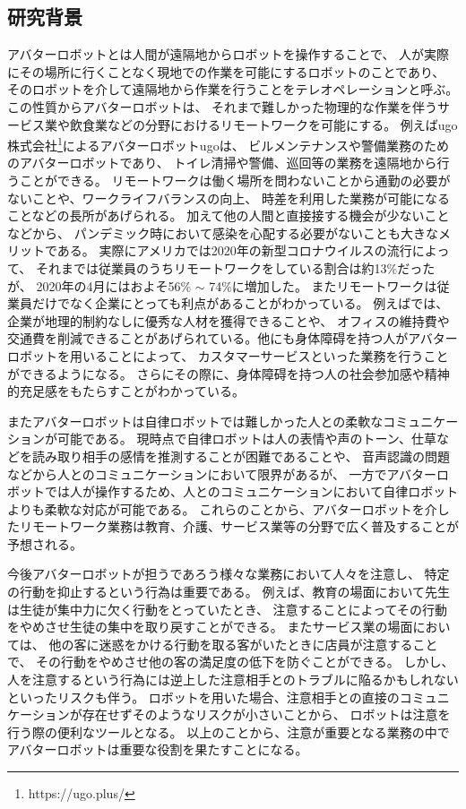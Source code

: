 \documentclass{kuisthesis}
\begin{document}
\subsection{研究背景} %
アバターロボットとは人間が遠隔地からロボットを操作することで、
人が実際にその場所に行くことなく現地での作業を可能にするロボットのことであり、
そのロボットを介して遠隔地から作業を行うことをテレオペレーションと呼ぶ。
この性質からアバターロボットは、
それまで難しかった物理的な作業を伴うサービス業や飲食業などの分野におけるリモートワークを可能にする。
例えばugo株式会社\footnote{https://ugo.plus/}によるアバターロボットugoは、
ビルメンテナンスや警備業務のためのアバターロボットであり、
トイレ清掃や警備、巡回等の業務を遠隔地から行うことができる。
リモートワークは働く場所を問わないことから通勤の必要がないことや、ワークライフバランスの向上、
時差を利用した業務が可能になることなどの長所があげられる。
加えて他の人間と直接接する機会が少ないことなどから、
パンデミック時において感染を心配する必要がないことも大きなメリットである。
実際にアメリカでは2020年の新型コロナウイルスの流行によって、
それまでは従業員のうちリモートワークをしている割合は約13\%だったが、
2020年の4月にはおよそ56\% $\sim$ 74\%に増加した\cite{ozimek2020future}。
またリモートワークは従業員だけでなく企業にとっても利点があることがわかっている。
例えば\cite{FERREIRA202170}では、企業が地理的制約なしに優秀な人材を獲得できることや、
オフィスの維持費や交通費を削減できることがあげられている。他にも身体障碍を持つ人がアバターロボットを用いることによって、
カスタマーサービスといった業務を行うことができるようになる。
さらにその際に、身体障碍を持つ人の社会参加感や精神的充足感をもたらすことがわかっている\cite{takeuchi2020avatar}。

またアバターロボットは自律ロボットでは難しかった人との柔軟なコミュニケーションが可能である。
現時点で自律ロボットは人の表情や声のトーン、仕草などを読み取り相手の感情を推測することが困難であることや、
音声認識の問題などから人とのコミュニケーションにおいて限界があるが、
一方でアバターロボットでは人が操作するため、人とのコミュニケーションにおいて自律ロボットよりも柔軟な対応が可能である。
これらのことから、アバターロボットを介したリモートワーク業務は教育、介護、サービス業等の分野で広く普及することが予想される。

今後アバターロボットが担うであろう様々な業務において人々を注意し、
特定の行動を抑止するという行為は重要である。
例えば、教育の場面において先生は生徒が集中力に欠く行動をとっていたとき、
注意することによってその行動をやめさせ生徒の集中を取り戻すことができる。
またサービス業の場面においては、
他の客に迷惑をかける行動を取る客がいたときに店員が注意することで、
その行動をやめさせ他の客の満足度の低下を防ぐことができる。
しかし、人を注意するという行為には逆上した注意相手とのトラブルに陥るかもしれないといったリスクも伴う。
ロボットを用いた場合、注意相手との直接のコミュニケーションが存在せずそのようなリスクが小さいことから、
ロボットは注意を行う際の便利なツールとなる。
以上のことから、注意が重要となる業務の中でアバターロボットは重要な役割を果たすことになる。
\end{document}
